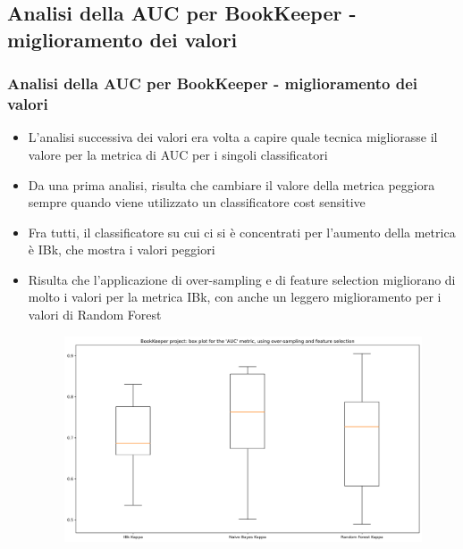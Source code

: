 \documentclass[10pt]{beamer}
\begin{document}
\begin{frame}
\subsection{Analisi della AUC per BookKeeper - miglioramento dei valori}
\frametitle{Analisi della AUC per BookKeeper - miglioramento dei valori}
\begin{itemize}
\item L'analisi successiva dei valori era volta a capire quale tecnica migliorasse il valore per la metrica di AUC per i singoli classificatori
\item Da una prima analisi, risulta che cambiare il valore della metrica peggiora sempre quando viene utilizzato un classificatore cost sensitive
\item Fra tutti, il classificatore su cui ci si è concentrati per l'aumento della metrica è IBk, che mostra i valori peggiori
\item Risulta che l'applicazione di over-sampling e di feature selection migliorano di molto i valori per la metrica IBk, con anche un leggero miglioramento per i valori di Random Forest
\begin{figure}
\includegraphics[scale=0.23]{images/auc_bett}
\end{figure}
\end{itemize}
\end{frame}
\end{document}
